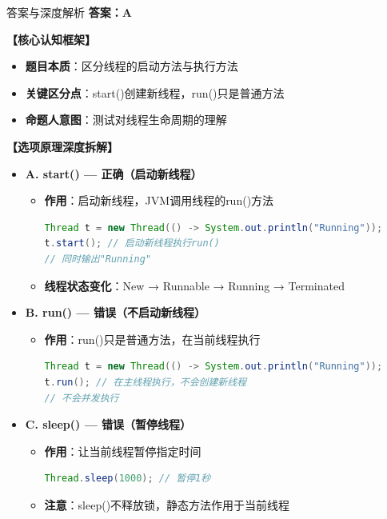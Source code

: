 \documentclass[12pt, a4paper]{ctexart}
\begin{document}
\begin{enumerate}[label=\textbf{\arabic*.}]
	      \begin{bluebox}{答案与深度解析}
		      \textbf{答案：A}

		      \textbf{【核心认知框架】}
		      \begin{itemize}[label={}, leftmargin=*, nosep]
			      \item \textbf{题目本质}：区分线程的启动方法与执行方法
			      \item \textbf{关键区分点}：start()创建新线程，run()只是普通方法
			      \item \textbf{命题人意图}：测试对线程生命周期的理解
		      \end{itemize}

		      \textbf{【选项原理深度拆解】}
					  \begin{itemize}[label={}, leftmargin=*, nosep]

		      \item \textbf{A. start() — 正确（启动新线程）}
		      \begin{itemize}[label={}, leftmargin=*, nosep]
			      \item \textbf{作用}：启动新线程，JVM调用线程的run()方法
			            \begin{lstlisting}[language=Java]
Thread t = new Thread(() -> System.out.println("Running"));
t.start(); // 启动新线程执行run()
// 同时输出"Running"
      \end{lstlisting}
			      \item \textbf{线程状态变化}：New → Runnable → Running → Terminated
		      \end{itemize}

		      \item \textbf{B. run() — 错误（不启动新线程）}
		      \begin{itemize}[label={}, leftmargin=*, nosep]
			      \item \textbf{作用}：run()只是普通方法，在当前线程执行
			            \begin{lstlisting}[language=Java]
Thread t = new Thread(() -> System.out.println("Running"));
t.run(); // 在主线程执行，不会创建新线程
// 不会并发执行
      \end{lstlisting}
		      \end{itemize}

		      \item \textbf{C. sleep() — 错误（暂停线程）}
		      \begin{itemize}[label={}, leftmargin=*, nosep]
			      \item \textbf{作用}：让当前线程暂停指定时间
			            \begin{lstlisting}[language=Java]
Thread.sleep(1000); // 暂停1秒
      \end{lstlisting}
			      \item \textbf{注意}：sleep()不释放锁，静态方法作用于当前线程
		      \end{itemize}


\end{itemize}
\end{bluebox}
\end{enumerate}
\end{document}
